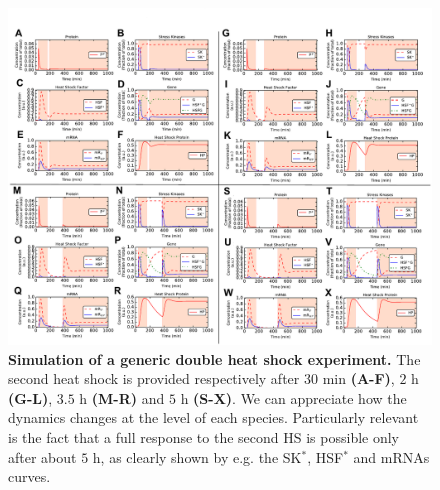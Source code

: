 \documentclass[oneside, 10pt, a4paper, twocolumn]{article}
\begin{document}
\begin{figure}
\centering
\includegraphics[width=\textwidth]{Figure7_SupMat.pdf}
\caption{\small{\textbf{Simulation of a generic double heat shock experiment.} The second heat shock is provided respectively after $30$ min \textbf{(A-F)}, $2$ h \textbf{(G-L)}, $3.5$ h \textbf{(M-R)} and $5$ h \textbf{(S-X)}. We can appreciate how the dynamics changes at the level of each species. Particularly relevant is the fact that a full response to the second HS is possible only after about $5$ h, as clearly shown by e.g. the SK$^*$, HSF$^*$ and mRNAs curves.}
}
\label{Figure7label}
\end{figure}
\end{document}
